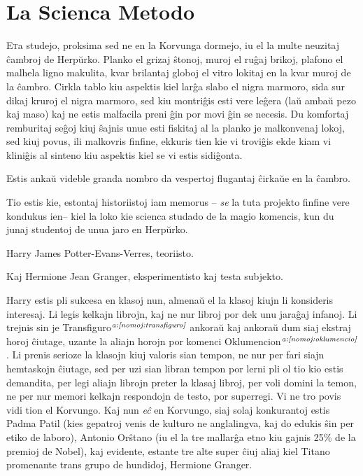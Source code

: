 \chapter{La Scienca Metodo}

\lettrine{E}ta studejo, proksima sed ne en la Korvunga dormejo, iu el
la multe neuzitaj ĉambroj de Herpŭrko. Planko el grizaj ŝtonoj, muroj
el ruĝaj brikoj, plafono el malhela ligno makulita, kvar brilantaj
globoj el vitro lokitaj en la kvar muroj de la ĉambro. Cirkla tablo
kiu aspektis kiel larĝa slabo el nigra marmoro, sida sur dikaj kruroj
el nigra marmoro, sed kiu montriĝis esti vere leĝera (laŭ ambaŭ pezo
kaj maso) kaj ne estis malfacila preni ĝin por movi ĝin se necesis. Du
komfortaj remburitaj seĝoj kiuj ŝajnis unue esti fiskitaj al la planko
je malkonvenaj lokoj, sed kiuj povus, ili malkovris finfine, ekkuris
tien kie vi troviĝis ekde kiam vi kliniĝis al sinteno kiu aspektis
kiel se vi estis sidiĝonta.


Estis ankaŭ videble granda nombro da vespertoj flugantaj ĉirkaŭe en la
ĉambro.

Tio estis kie, estontaj historiistoj iam memorus -- \emph{se} la tuta
projekto finfine vere kondukus ien-- kiel la loko kie scienca studado
de la magio komencis, kun du junaj studentoj de unua jaro en Herpŭrko.

Harry James Potter-Evans-Verres, teoriisto.

Kaj Hermione Jean Granger, eksperimentisto kaj testa subjekto.

Harry estis pli sukcesa en klasoj nun, almenaŭ el la klasoj kiujn li
konsideris interesaj. Li legis kelkajn librojn, kaj ne nur libroj por
dek unu jaraĝaj infanoj. Li trejnis sin je
Transfiguro$^{\textit{a:\ref{nomoj:transfiguro}}}$ ankoraŭ kaj ankoraŭ
dum siaj ekstraj horoj ĉiutage, uzante la aliajn horojn por komenci
Oklumencion$^{\textit{a:\ref{nomoj:oklumencio}}}$. Li prenis serioze
la klasojn kiuj valoris sian tempon, ne nur per fari siajn hemtaskojn
ĉiutage, sed per uzi sian libran tempon por lerni pli ol tio kio estis
demandita, per legi aliajn librojn preter la klasaj libroj, per voli
domini la temon, ne per nur memori kelkajn respondojn de testo, por
superregi. Vi ne tro povis vidi tion el Korvungo. Kaj nun \emph{eĉ} en
Korvungo, siaj solaj konkurantoj estis Padma Patil (kies gepatroj
venis de kulturo ne anglalingva, kaj do edukis ŝin per etiko de
laboro), Antonio Orŝtano (iu el la tre mallarĝa etno kiu gajnis 25\%
de la premioj de Nobel), kaj evidente, estante tre alte super ĉiuj
aliaj kiel Titano promenante trans grupo de hundidoj, Hermione
Granger.

